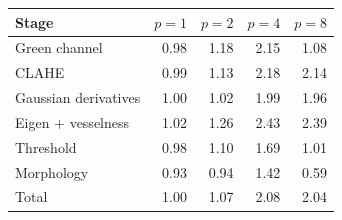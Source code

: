 \begin{tabular}{lrrrr}
\toprule
Stage & $p=1$ & $p=2$ & $p=4$ & $p=8$ \\
\midrule
Green channel & 0.98 & 1.18 & 2.15 & 1.08 \\
CLAHE & 0.99 & 1.13 & 2.18 & 2.14 \\
Gaussian derivatives & 1.00 & 1.02 & 1.99 & 1.96 \\
Eigen + vesselness & 1.02 & 1.26 & 2.43 & 2.39 \\
Threshold & 0.98 & 1.10 & 1.69 & 1.01 \\
Morphology & 0.93 & 0.94 & 1.42 & 0.59 \\
Total & 1.00 & 1.07 & 2.08 & 2.04 \\
\bottomrule
\end{tabular}
